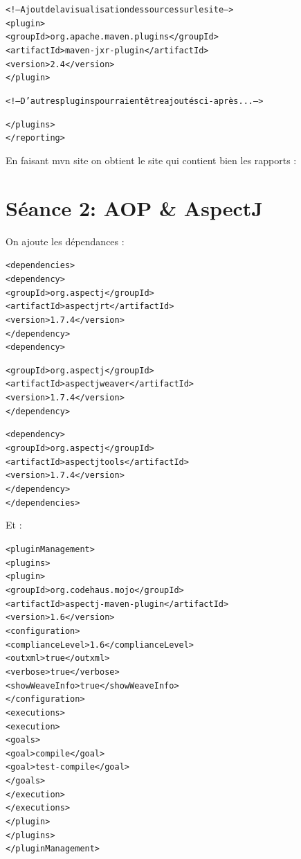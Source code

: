 \documentclass{article}
\begin{document}
\begin{alltt}
      <!-- Ajout de la visualisation des sources sur le site -->
      <plugin>
	<groupId>org.apache.maven.plugins</groupId>
	<artifactId>maven-jxr-plugin</artifactId>
	<version>2.4</version>
      </plugin>

      <!-- D'autres plugins pourraient être ajoutés ci-après ... -->
      
    </plugins>
  </reporting>
\end{alltt}

En faisant mvn site on obtient le site qui contient bien les rapports :


\begin{center}
\end{center}

\section{Séance 2: AOP \& AspectJ}

On ajoute les dépendances :
\begin{alltt}
  <dependencies>
<dependency>
      <groupId>org.aspectj</groupId>
      <artifactId>aspectjrt</artifactId>
      <version>1.7.4</version>
    </dependency>
    <dependency>

      <groupId>org.aspectj</groupId>
      <artifactId>aspectjweaver</artifactId>
      <version>1.7.4</version>
    </dependency>

    <dependency>
      <groupId>org.aspectj</groupId>
      <artifactId>aspectjtools</artifactId>
      <version>1.7.4</version>
    </dependency>
  </dependencies>
\end{alltt}
Et : 

\begin{alltt}
  <pluginManagement>
    <plugins>
      <plugin>
	<groupId>org.codehaus.mojo</groupId>
	<artifactId>aspectj-maven-plugin</artifactId>
	<version>1.6</version>
	<configuration>
	  <complianceLevel>1.6</complianceLevel>
	  <outxml>true</outxml>
	  <verbose>true</verbose>
	  <showWeaveInfo>true</showWeaveInfo>
	</configuration>
	<executions>
	  <execution>
	    <goals>
	      <goal>compile</goal>
	      <goal>test-compile</goal>
	    </goals>
	  </execution>
	</executions>
      </plugin>
    </plugins>
  </pluginManagement>
\end{alltt}
\end{document}
